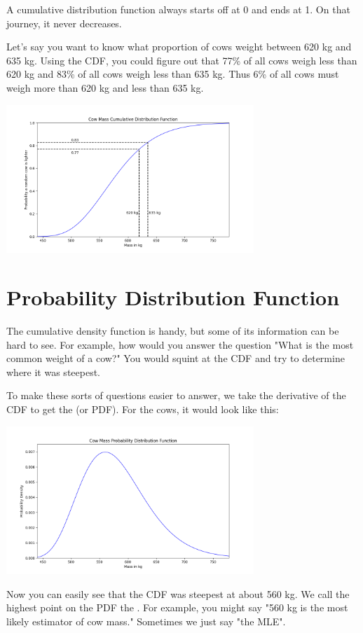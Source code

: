 A cumulative distribution function always starts off at 0 and ends at 1.  On that journey, it never decreases.

Let's say you want to know what proportion of cows weight between 620 kg and 635 kg.  Using the CDF, you could figure out that 77\% of all cows weigh less than 620 kg and 83\% of all cows 
weigh less than 635 kg.  Thus 6\% of all cows must weigh more than 620 kg and less than 635 kg.

\includegraphics[width=0.7\textwidth]{cow_cdf_bounds.png}

\section{Probability Distribution Function}

The cumulative density function is handy,  but some of its information can be hard to see.  For example,  how would you answer the question "What is the most common weight of a cow?"  You would
squint at the CDF and try to determine where it was steepest.

To make these sorts of questions easier to answer,  we take the derivative of the CDF to get the  (or PDF).  For the cows,  it would look like this:

\includegraphics[width=0.7\textwidth]{cow_pdf.png}

Now you can easily see that the CDF was steepest at about 560 kg.  We call the highest point on the PDF the .  For example, you might say "560 kg is the most likely estimator of cow mass."  Sometimes we just say "the MLE".

